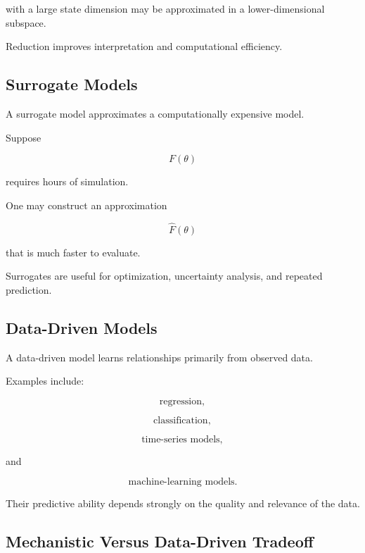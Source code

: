 with a large state dimension may be approximated in a lower-dimensional
subspace.

Reduction improves interpretation and computational efficiency.

\subsection{Surrogate Models}
\label{subsec:surrogate-models}

A surrogate model approximates a computationally expensive model.

Suppose

\[
F(\theta)
\]

requires hours of simulation.

One may construct an approximation

\[
\boxed{
\widehat{F}(\theta)
}
\]

that is much faster to evaluate.

Surrogates are useful for optimization, uncertainty analysis, and repeated
prediction.

\subsection{Data-Driven Models}
\label{subsec:data-driven-models}

A data-driven model learns relationships primarily from observed data.

Examples include:

\[
\boxed{
\text{regression},
}
\]

\[
\boxed{
\text{classification},
}
\]

\[
\boxed{
\text{time-series models},
}
\]

and

\[
\boxed{
\text{machine-learning models}.
}
\]

Their predictive ability depends strongly on the quality and relevance of
the data.

\subsection{Mechanistic Versus Data-Driven Tradeoff}
\label{subsec:mechanistic-data-driven-tradeoff}

